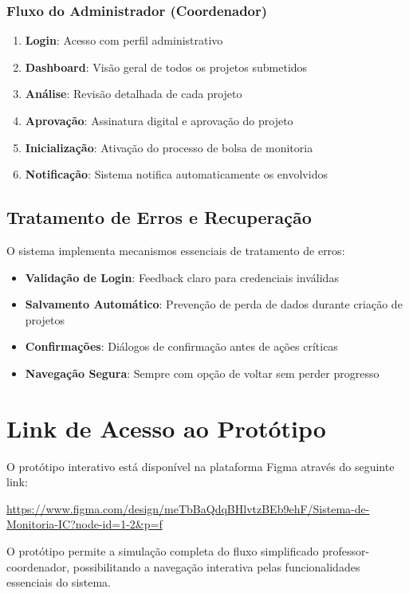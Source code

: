\documentclass[12pt, a4paper]{report}
\begin{document}
\subsubsection{Fluxo do Administrador (Coordenador)}
\begin{enumerate}
    \item \textbf{Login}: Acesso com perfil administrativo
    \item \textbf{Dashboard}: Visão geral de todos os projetos submetidos
    \item \textbf{Análise}: Revisão detalhada de cada projeto
    \item \textbf{Aprovação}: Assinatura digital e aprovação do projeto
    \item \textbf{Inicialização}: Ativação do processo de bolsa de monitoria
    \item \textbf{Notificação}: Sistema notifica automaticamente os envolvidos
\end{enumerate}

\subsection{Tratamento de Erros e Recuperação}

O sistema implementa mecanismos essenciais de tratamento de erros:

\begin{itemize}
    \item \textbf{Validação de Login}: Feedback claro para credenciais inválidas
    \item \textbf{Salvamento Automático}: Prevenção de perda de dados durante criação de projetos
    \item \textbf{Confirmações}: Diálogos de confirmação antes de ações críticas
    \item \textbf{Navegação Segura}: Sempre com opção de voltar sem perder progresso
\end{itemize}

\section{Link de Acesso ao Protótipo}

O protótipo interativo está disponível na plataforma Figma através do seguinte link:

\url{https://www.figma.com/design/meTbBaQdqBHlvtzBEb9ehF/Sistema-de-Monitoria-IC?node-id=1-2&p=f}

O protótipo permite a simulação completa do fluxo simplificado professor-coordenador, possibilitando a navegação interativa pelas funcionalidades essenciais do sistema.
\end{document}
